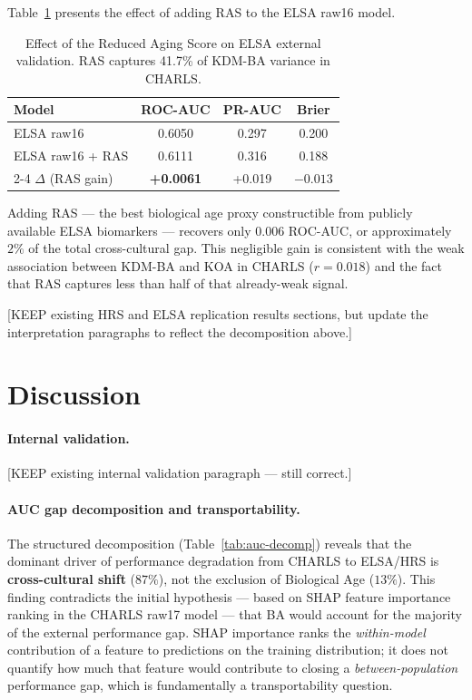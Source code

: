 \documentclass[11pt,a4paper]{article}
\begin{document}
Table~\ref{tab:ras} presents the effect of adding RAS to the ELSA raw16 model.

\begin{table}[h!]
\centering
\small
\caption{Effect of the Reduced Aging Score on ELSA external validation.
RAS captures 41.7\% of KDM-BA variance in CHARLS.}
\label{tab:ras}
\begin{tabular}{lccc}
\toprule
Model & ROC-AUC & PR-AUC & Brier \\
\midrule
ELSA raw16              & 0.6050 & 0.297 & 0.200 \\
ELSA raw16 + RAS        & 0.6111 & 0.316 & 0.188 \\
\cmidrule{2-4}
$\Delta$ (RAS gain)     & \textbf{+0.0061} & +0.019 & $-0.013$ \\
\bottomrule
\end{tabular}
\end{table}

Adding RAS — the best biological age proxy constructible from publicly available
ELSA biomarkers — recovers only $0.006$ ROC-AUC, or approximately $2\%$ of the
total cross-cultural gap. This negligible gain is consistent with the weak
association between KDM-BA and KOA in CHARLS ($r=0.018$) and the fact that RAS
captures less than half of that already-weak signal.

[KEEP existing HRS and ELSA replication results sections, but update the
interpretation paragraphs to reflect the decomposition above.]

\section{Discussion}

\paragraph{Internal validation.}
[KEEP existing internal validation paragraph — still correct.]

\paragraph{AUC gap decomposition and transportability.}
The structured decomposition (Table~\ref{tab:auc-decomp}) reveals that the dominant
driver of performance degradation from CHARLS to ELSA/HRS is \textbf{cross-cultural
shift} ($87\%$), not the exclusion of Biological Age ($13\%$). This finding
contradicts the initial hypothesis — based on SHAP feature importance ranking in the
CHARLS raw17 model — that BA would account for the majority of the external
performance gap. SHAP importance ranks the \textit{within-model} contribution of a
feature to predictions on the training distribution; it does not quantify how much
that feature would contribute to closing a \textit{between-population} performance
gap, which is fundamentally a transportability question.
\end{document}
